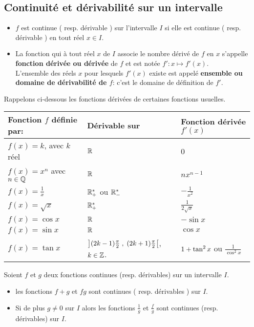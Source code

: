 \subsection{Continuité et dérivabilité sur un intervalle}
\begin{definition}
\begin{itemize}
\item  $ f $ est continue  ( resp. dérivable ) sur l'intervalle  $ I $ si elle est continue ( resp. dérivable ) en tout réel  $x \in I. $
\item 	La fonction qui à tout réel $ x $  de $ I $ associe le nombre dérivé de $ f $ en $ x $ s'appelle \textbf{ fonction dérivée  ou dérivée} de $ f $ et est notée $ f': x\mapsto f'(x) $. \\
  L'ensemble des réels $ x $ pour lesquels $f'(x) $ existe est appelé \textbf{ ensemble ou domaine de dérivabilité de $f$}: c'est le domaine de définition de $ f'. $
  \end{itemize}
\end{definition}

Rappelons  ci-dessous les fonctions dérivées de certaines fonctions usuelles.
\medskip

\begin{tabularx}{\textwidth}{|X|X|X|}
\hline
\textbf{Fonction $f$ définie par:}  & \textbf{Dérivable sur} &\textbf{ Fonction dérivée $ f'(x) $ }  \\
\hline
$ f(x)=k$, avec $k$ réel  & $\mathbb{R}$ & 0 \\
\hline
$f(x)= x^{n} $  avec $n\in \mathbb{Q}$ &  $\mathbb{R}$  & $ nx^{n-1} $   \\
\hline
$f(x)= \frac{1}{x} $ &  $\mathbb{R}_+^*$ ou $\mathbb{R}_-^*$ & $ -\frac{1}{x^{2}} $\\
\hline
$f(x)= \sqrt{x} $ &  $\mathbb{R}_+^*$ &  $ \frac{1}{2\sqrt{x}} $\\
\hline
$f(x)= \cos x $  &  $\mathbb{R}$  & $ -\sin x $ \\
\hline
$f(x)= \sin x $   &  $\mathbb{R}$  & $ \cos x $\\
\hline
$f(x)= \tan x $  &  $\left](2k-1)\frac{\pi}{2} \;,\; (2k+1)\frac{\pi}{2}\right[$, $ k\in\mathbb{Z} $.  & $\small  1+\tan^{2}x $ ou $\frac{1}{\cos^{2} x} $ \\
\hline
\end{tabularx}


\begin{property}
Soient $f $ et  $ g$ deux fonctions continues (resp. dérivables) sur un intervalle $ I. $

\begin{itemize}
\item les fonctions $ f+g $ et $ fg $ sont continues ( resp. dérivables ) sur   $ I. $
\item  Si de plus $ g\neq0 $ sur  $ I $ alors les fonctions $\frac{1}{g} $ et  $\frac{f}{g} $ sont continues (resp. dérivables) sur $ I. $
\end{itemize}
\end{property}

